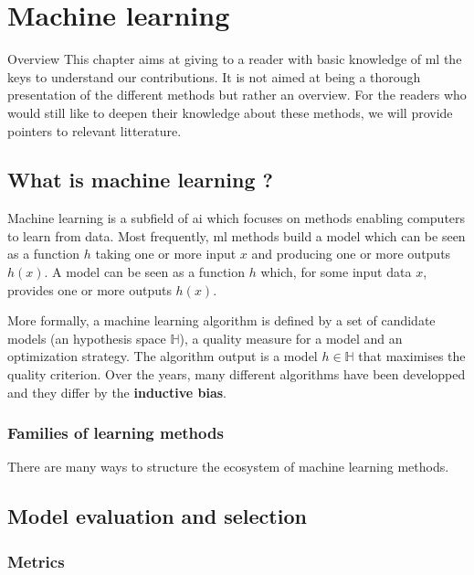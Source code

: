 \chapter{Machine learning}
\label{chap:backml}

\begin{overview}{Overview}
This chapter aims at giving to a reader with basic knowledge of \acrshort{ml} the keys to understand our contributions. It is not aimed at being a thorough presentation of the different methods but rather an overview. For the readers who would still like to deepen their knowledge about these methods, we will provide pointers to relevant litterature.
\end{overview}

\section{What is machine learning ?} 
\label{sec:backml:whatisml}

Machine learning is a subfield of \acrlong{ai} which focuses on methods enabling computers to learn from data. Most frequently, \acrlong{ml} methods build a model which can be seen as a function $h$ taking one or more input $x$ and producing one or more outputs $h(x)$.  A model can be seen as a function $h$ which, for some input data $x$, provides one or more outputs $h(x)$. 

 More formally, a machine learning algorithm is defined by a set of candidate models (\ie an hypothesis space $\mathbb{H}$), a quality measure for a model and an optimization strategy. The algorithm output is a model $h \in \mathbb{H}$ that maximises the quality criterion. Over the years, many different algorithms have been developped and they differ by the \textbf{inductive bias}.  

\subsection{Families of learning methods}

There are many ways to structure the ecosystem of machine learning methods. 


\section{Model evaluation and selection}

\subsection{Metrics}

